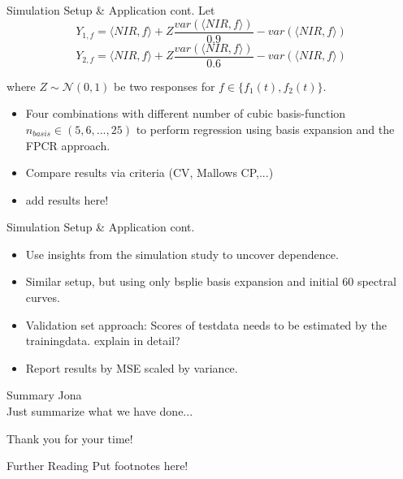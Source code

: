 \documentclass{beamer}
\begin{document}
	
	\begin{frame}{Simulation Setup \& Application cont.}
		Let 
		$$Y_{1,f} = \langle NIR, f\rangle + Z  \frac{var(\langle NIR, f\rangle)}{0.9} - var(\langle NIR, f\rangle)$$ 
		$$Y_{2,f} = \langle NIR, f\rangle + Z  \frac{var(\langle NIR, f\rangle)}{0.6} - var(\langle NIR, f\rangle)$$
		
		where $Z \sim \mathcal{N}(0,1)$ be two responses for $f \in \{f_1(t), f_2(t)\}$.	
		\begin{itemize}
    		\item Four combinations with different number of cubic basis-function $n_{basis} \in (5,6,...,25)$ to perform regression using basis expansion and the FPCR approach.
			\item Compare results via criteria (CV, Mallows CP,...)
			\item {\color{green} add results here!}
		\end{itemize}
	\end{frame}
	
	
	\begin{frame}{Simulation Setup \& Application cont.}
		\begin{itemize}
		\item
    		Use insights from the simulation study to uncover dependence.
    		\item
    		Similar setup, but using only bsplie basis expansion and initial 60 spectral curves.
    		\item
    		Validation set approach:	Scores of testdata needs to be estimated by the trainingdata.  {\color{green} explain in detail?}
    		\item
    		Report results by MSE scaled by variance.
		\end{itemize}
	\end{frame}
	
	\begin{frame}{Summary}
		Jona \\
		Just summarize what we have done...
	\end{frame}
	
	\begin{frame}
		\vspace*{\fill}
		\begin{center}
			{\LARGE Thank you for your time!}
		\end{center}	
		\vspace*{\fill}
	\end{frame}
	
	\begin{frame}{Further Reading}
		 Put footnotes here!
	\end{frame}
	
\end{document}
